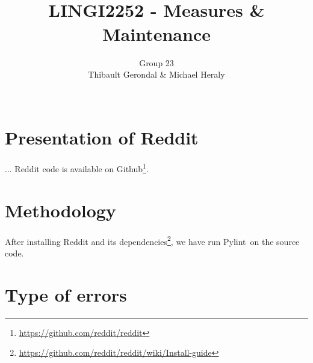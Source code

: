 \documentclass[11pt, a4paper]{article}
\title{\tbf{UCL} \\
	LINGI2252 - Measures \& Maintenance}
\author{Group 23 \\
		Thibault Gerondal \& Michael Heraly \\
		\\
		\tit{Teacher: Kim Mens}}
\newcommand{\pyl}{\textsf{Pylint}\ }
\begin{document}
\maketitle


\section*{Presentation of Reddit}

...
Reddit code is available on Github\footnote{\url{https://github.com/reddit/reddit}}.


\section{Methodology}

After installing Reddit and its dependencies\footnote{\url{https://github.com/reddit/reddit/wiki/Install-guide}}, we have run \pyl on the source code.


\section{Type of errors}
\end{document}

